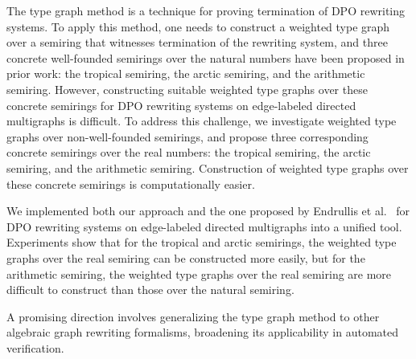 The type graph method is a technique for proving termination of DPO rewriting systems. 
To apply this method, one needs to construct a weighted type graph over a semiring that witnesses termination of the rewriting system, and three concrete well-founded semirings over the natural numbers have been proposed in prior work: the tropical semiring, the arctic semiring, and the arithmetic semiring.
However, constructing suitable weighted type graphs over these concrete semirings for DPO rewriting systems on edge-labeled directed multigraphs is difficult. 
To address this challenge, we investigate weighted type graphs over non-well-founded semirings, and propose three corresponding concrete semirings over the real numbers: the tropical semiring, the arctic semiring, and the arithmetic semiring. Construction of weighted type graphs over these concrete semirings is computationally easier.
    
We implemented both our approach and the one proposed by Endrullis et al.~\cite{endrullis2024generalized_arxiv_v2} for DPO rewriting systems on edge-labeled directed multigraphs into a unified tool. Experiments show that for the tropical and arctic semirings, the weighted type graphs over the real semiring can be constructed more easily, but for the arithmetic semiring, the weighted type graphs over the real semiring are more difficult to construct than those over the natural semiring.

A promising direction involves generalizing the type graph method to other algebraic graph rewriting formalisms, broadening its applicability in automated verification. 
  